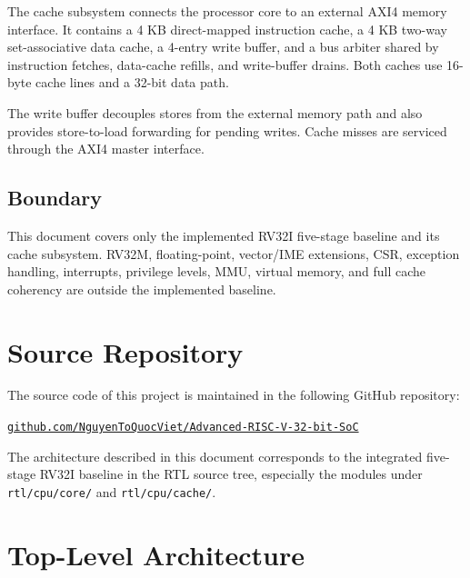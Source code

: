 \documentclass[11pt,a4paper]{article}
\begin{document}
The cache subsystem connects the processor core to an external AXI4 memory
interface. It contains a 4 KB direct-mapped instruction cache, a 4 KB
two-way set-associative data cache, a 4-entry write buffer, and a bus
arbiter shared by instruction fetches, data-cache refills, and write-buffer
drains. Both caches use 16-byte cache lines and a 32-bit data path.

The write buffer decouples stores from the external memory path and also
provides store-to-load forwarding for pending writes. Cache misses are
serviced through the AXI4 master interface.

\subsection{Boundary}

This document covers only the implemented RV32I five-stage baseline and
its cache subsystem. RV32M, floating-point, vector/IME extensions, CSR,
exception handling, interrupts, privilege levels, MMU, virtual memory, and
full cache coherency are outside the implemented baseline.

\section{Source Repository}

The source code of this project is maintained in the following GitHub repository:

\begin{center}
\href{https://github.com/NguyenToQuocViet/Advanced-RISC-V-32-bit-SoC}
{\texttt{github.com/NguyenToQuocViet/Advanced-RISC-V-32-bit-SoC}}
\end{center}

The architecture described in this document corresponds to the integrated
five-stage RV32I baseline in the RTL source tree, especially the modules under
\texttt{rtl/cpu/core/} and \texttt{rtl/cpu/cache/}.

\clearpage
\section{Top-Level Architecture}
\end{document}
